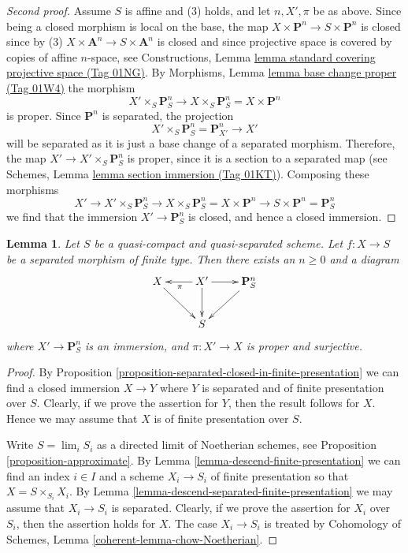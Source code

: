 \documentclass{amsart}
\theoremstyle{plain}
\newtheorem{lemma}[subsection]{Lemma}
\theoremstyle{definition}
\theoremstyle{remark}
\numberwithin{equation}{subsection}
\def\lim{\mathop{\mathrm{lim}}\nolimits}
\begin{document}
\begin{proof}[Second proof]
\medskip\noindent
Assume $S$ is affine and (3) holds, and let $n, X', \pi$ be as above.
Since being a closed morphism is local on the base, the map
$X \times \mathbf{P}^n \to S \times \mathbf{P}^n$ is closed since by (3)
$X \times \mathbf{A}^n \to S \times \mathbf{A}^n$ is closed and since
projective space is covered by copies of affine $n$-space, see
Constructions,
Lemma \href{https://stacks.math.columbia.edu/tag/01NG}{lemma standard covering projective space (Tag 01NG)}.
By Morphisms, Lemma \href{https://stacks.math.columbia.edu/tag/01W4}{lemma base change proper (Tag 01W4)}
the morphism
$$
X' \times_S \mathbf{P}^n_S
\to
X \times_S \mathbf{P}^n_S =
X \times \mathbf{P}^n
$$
is proper. Since $\mathbf{P}^n$ is separated, the projection
$$
X' \times_S \mathbf{P}^n_S = \mathbf{P}^n_{X'} \to X'
$$
will be separated as it is just a base change of a separated
morphism. Therefore, the map $X' \to X' \times_S \mathbf{P}^n_S$ is proper,
since it is a section to a separated map (see
Schemes, Lemma \href{https://stacks.math.columbia.edu/tag/01KT}{lemma section immersion (Tag 01KT)}).
Composing these morphisms
$$
X' \to X' \times_S \mathbf{P}^n_S \to X \times_S \mathbf{P}^n_S
= X \times \mathbf{P}^n \to S \times \mathbf{P}^n = \mathbf{P}^n_S
$$
we find that the immersion $X' \to \mathbf{P}^n_S$ is closed, and
hence a closed immersion.
\end{proof}


\begin{lemma}
\label{lemma-chow-finite-type}
Let $S$ be a quasi-compact and quasi-separated scheme.
Let $f : X \to S$ be a separated morphism of finite type.
Then there exists an $n \geq 0$ and a diagram
$$
\xymatrix{
X \ar[rd] & X' \ar[d] \ar[l]^\pi \ar[r] & \mathbf{P}^n_S \ar[dl] \\
& S &
}
$$
where $X' \to \mathbf{P}^n_S$ is an immersion, and
$\pi : X' \to X$ is proper and surjective.
\end{lemma}

\begin{proof}
By Proposition \ref{proposition-separated-closed-in-finite-presentation}
we can find a closed immersion $X \to Y$ where $Y$ is separated
and of finite presentation over $S$. Clearly, if we prove the assertion
for $Y$, then the result follows for $X$. Hence we may assume that
$X$ is of finite presentation over $S$.

\medskip\noindent
Write $S = \lim_i S_i$ as a directed limit of Noetherian schemes, see
Proposition \ref{proposition-approximate}. By
Lemma \ref{lemma-descend-finite-presentation} we can
find an index $i \in I$ and a scheme $X_i \to S_i$ of finite presentation
so that $X = S \times_{S_i} X_i$.
By Lemma \ref{lemma-descend-separated-finite-presentation}
we may assume that $X_i \to S_i$ is separated.
Clearly, if we prove the assertion for
$X_i$ over $S_i$, then the assertion holds for $X$. The case
$X_i \to S_i$ is treated by
Cohomology of Schemes, Lemma \ref{coherent-lemma-chow-Noetherian}.
\end{proof}
\end{document}
